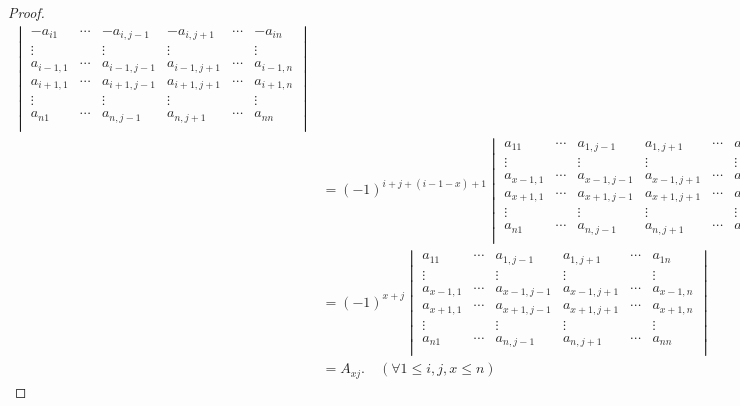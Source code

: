 \documentclass{article}
\begin{document}
\begin{enumerate}
\begin{proof}
\begin{align*}
\begin{vmatrix}
                -a_{i1} & \cdots & -a_{i,j-1} & -a_{i,j+1} & \cdots & -a_{in}\\
                \vdots &        & \vdots & \vdots & & \vdots\\
                a_{i-1,1} & \cdots & a_{i-1,j-1} & a_{i-1,j+1} &\cdots & a_{i-1,n}\\
                a_{i+1,1} & \cdots & a_{i+1,j-1} & a_{i+1,j+1} &\cdots & a_{i+1,n}\\
                \vdots &        & \vdots & \vdots & & \vdots\\
                a_{n1} & \cdots & a_{n,j-1} & a_{n,j+1} & \cdots & a_{nn} \\
            \end{vmatrix}\\
            &={(-1)}^{i+j+(i-1-x)+1}
            \begin{vmatrix}
                a_{11} & \cdots & a_{1,j-1} & a_{1,j+1} & \cdots & a_{1n} \\
                \vdots &        & \vdots & \vdots & & \vdots\\
                a_{x-1,1} & \cdots & a_{x-1,j-1} & a_{x-1,j+1} &\cdots & a_{x-1,n}\\
                a_{x+1,1} & \cdots & a_{x+1,j-1} & a_{x+1,j+1} &\cdots & a_{x+1,n}\\
                \vdots &        & \vdots & \vdots & & \vdots\\
                a_{n1} & \cdots & a_{n,j-1} & a_{n,j+1} & \cdots & a_{nn} \\
            \end{vmatrix}\\
            &={(-1)}^{x+j}
            \begin{vmatrix}
                a_{11} & \cdots & a_{1,j-1} & a_{1,j+1} & \cdots & a_{1n} \\
                \vdots &        & \vdots & \vdots & & \vdots\\
                a_{x-1,1} & \cdots & a_{x-1,j-1} & a_{x-1,j+1} &\cdots & a_{x-1,n}\\
                a_{x+1,1} & \cdots & a_{x+1,j-1} & a_{x+1,j+1} &\cdots & a_{x+1,n}\\
                \vdots &        & \vdots & \vdots & & \vdots\\
                a_{n1} & \cdots & a_{n,j-1} & a_{n,j+1} & \cdots & a_{nn} \\
            \end{vmatrix}\\
            &=A_{xj}.\quad (\forall 1\leq i,j,x\leq n)

\end{align*}
\end{proof}
\end{enumerate}
\end{document}
